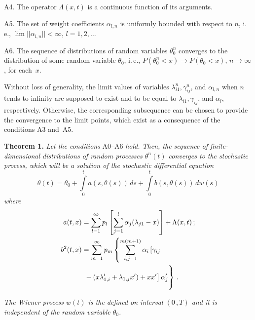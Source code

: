 \begin{multicols}{2}
A4. The operator $\Lambda (x,t)$ is a continuous function of its arguments.

A5. The set of weight coefficients $\alpha_{l,n} $ is uniformly bounded with respect 
to $n$, i.\,e., $\overline{\lim }||\alpha_{l,n} ||<\infty $, $l=1,2, \dots$

A6. The sequence of distributions of random variables $\theta_{0}^{n} $ 
converges to the distribution of some random variable $\theta_{0}^{} $, i.\,e.,
 $P(\theta_{0}^{n} <x)\to P(\theta_{0} <x)$, $n\to \infty$, for each~$x$.

Without loss of generality, the limit values of variables $\lambda_{i1}^{n} ,\gamma_{ij}^{n}$, 
and $\alpha_{l,n} $ when $n$ tends to infinity are supposed to exist and to be equal to 
$\lambda_{i1} , \gamma_{ij}$, and $\alpha_{l} $, respectively. Otherwise, the corresponding 
subsequence can be chosen to provide the convergence to the limit points, which exist as a 
consequence of the conditions A3 and~A5.

\medskip

\noindent 
\textbf{Theorem 1.}
\textit{Let the conditions} A0--A6 \textit{hold. Then, the sequence of finite-dimensional distributions 
of random processes $\theta ^{n} (t)$ converges to the stochastic process, which will 
be a solution of the stochastic differential equation}
\begin{equation*}
\theta (t)=\theta_{0} +\int\limits_{0}^{t}a(s,\theta (s))\,ds+\int\limits_{0}^{t}b  
(s,\theta (s))\,dw(s) 
\end{equation*}
\textit{where }
\begin{align}
a(t,x)&=\sum\limits_{l=1}^{\infty }p_{l}  
\left[\sum\limits_{j=1}^{l}\alpha_{j}  (\lambda_{j1} -x)\right]+\Lambda (x,t) \,;
\label{e5.1-b}\\ %
b^{2} (t,x)&=  \sum\limits_{m=1}^{\infty }p_{m}  
\left\{ \sum\limits_{i,j=1}^{m(m+1)}\alpha_{i}  \left[
\gamma_{ij}\right.\right.\notag\\
&\left.\left.{} -(x\lambda '_{1,i} +\lambda_{1,j} x')+xx'\right]\alpha '_{j} 
\vphantom{\sum\limits_{j=1}^m(m)}\right\}\,.
\label{e5.2-b}
\end{align}

\textit{The Wiener process $w(t)$ is the defined on interval $(0\,,T)$ and it is independent 
of the random variable $\theta_{0} $.}

\smallskip


\end{multicols}
